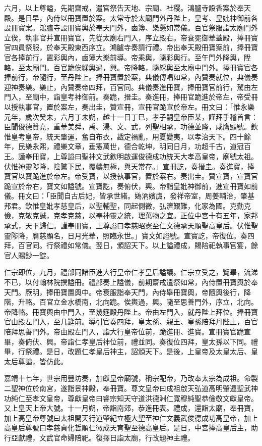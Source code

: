 六月，以上尊謚，先期齋戒，遣官祭告天地、宗廟、社稷。鴻臚寺設香案於奉天殿。是日早，內侍以冊寶置於案。太常寺於太廟門外丹陛上，皇考、皇妣神御前各設冊寶案。鴻臚寺設冊寶輿於奉天門外，鹵簿、樂懸如常儀。百官祭服詣太廟門外立俟，執事官并宣冊寶官，先從太廟右門入，序立殿右。帝袞冕御華蓋殿，捧冊寶官四員祭服，於奉天殿東西序立。鴻臚寺奏請行禮。帝出奉天殿冊寶案前，捧冊寶官各捧前行，置彩輿內，鹵簿大樂前導。帝乘輿，隨彩輿行。至午門外降輿，陞輅，至太廟門。百官跪俟綵輿過，興。帝降輅，隨綵輿至太廟中門外。捧冊寶官各捧前行，帝隨行，至丹陛上。捧冊寶置於案，典儀傳唱如常，內贊奏就位，典儀奏迎神奏樂。樂止，內贊奏帝四拜，百官同。典儀奏進冊寶，捧冊寶官前行，駕由左門入，至廟中，詣皇考神御前。奏跪，搢圭。奏進冊，捧冊官跪進於帝左，帝受冊以授執事官，置於案左，奏出圭，贊宣冊，宣冊官跪宣於帝左。冊文曰：「惟永樂元年，歲次癸未，六月丁未朔，越十一日丁巳，孝子嗣皇帝臣某，謹拜手稽首言：臣聞俊德贊堯，重華美舜，禹、湯、文、武，列聖相承，功德並隆，咸膺顯號。欽惟皇考皇帝，統天肇運，奮自布衣，戡定禍亂，用夏變夷，以孝治天下。四十餘年，民樂永熙，禮樂文章，垂憲萬世，德合乾坤，明同日月，功超千古，道冠百王。謹奉冊寶，上尊謚曰聖神文武欽明啟運俊德成功統天大孝高皇帝，廟號太祖。伏惟神靈陟降，陰騭下民，覆幬無極，與天常存。」宣冊訖，奏搢圭。奏進寶，捧寶官以寶跪進於帝左。帝受寶，以授執事官，置於案右。奏出圭。贊宣寶，宣寶官跪宣於帝右，寶文如謚號。宣寶訖，奏俯伏，興。帝詣皇妣神御前，進宣冊寶如前儀。冊文曰：「臣聞自古后妃，皆承世緒。媯汭嬪虞，發祥帝室，周姜輔治，肇基邦君。欽惟皇妣孝慈皇后，以聖輔聖，同起側微，弘濟艱難，化家為國。克勤克儉，克敬克誠，克孝克慈，以奉神靈之統，理萬物之宜。正位中宮十有五年，家邦承式，天下歸仁。謹奉冊寶，上尊謚曰孝慈昭憲至仁文德承天順聖高皇后。伏惟聖靈陟降，膺慈顯名，日月光華，照臨永世。」寶文如謚號。宣寶訖，帝復位。奏四拜，百官同。行祭禮如常儀。翌日，頒詔天下。以上謚禮成，賜陪祀執事官宴，餘官人賜鈔一錠。

仁宗即位，九月，禮部同諸臣進大行皇帝仁孝皇后謚議。仁宗立受之，覽畢，流涕不已，以付翰林院撰謚冊。禮部奏上謚儀，前期齋戒遣祭如常，內侍置冊寶輿於奉天門。厥明，捧冊寶置輿中。帝衰服詣奉天門，內侍舉冊寶輿，帝隨輿後行，降階，升輅。百官立金水橋南，北向跪。俟輿過，興。隨至思善門外，序立，北向。帝降輅。冊寶輿由中門入，至幾筵殿丹陛上。帝由左門入，就丹陛上拜位。捧冊寶官由殿左門入，至几筵前。導引官奏四拜，皇太孫、親王、皇孫陪拜丹陛上，百官陪拜思善門外。帝由殿左門入，詣大行皇帝位前，跪進冊、進寶。宣冊寶官跪宣畢，奏俯伏、興。帝詣仁孝皇后神位前，禮並同。奏復位四拜，皇太孫以下同。禮畢，行祭禮。是日，改題仁孝皇后神主，詔頒天下。是後，上皇帝及太皇太后、皇太后尊謚，皆仿此。

嘉靖十七年，世宗用豐坊奏，加獻皇帝廟號，稱宗配帝，乃改奉太宗為成祖。命製二聖神位於南宮，遂詣景神殿，奉冊寶。尊文皇帝曰成祖啟天弘道高明肇運聖武神功純仁至孝文皇帝，尊獻皇帝曰睿宗知天守道洪德淵仁寬穆純聖恭儉敬文獻皇帝。又上皇天上帝大號。十一月朔，帝詣南郊，恭進冊表。禮成，還詣太廟，奉冊寶，加上高皇帝尊號曰太祖開天行道肇紀立極大聖至神仁文義武俊德成功高皇帝，加上高皇后尊號曰孝慈貞化哲順仁徽成天育聖至德高皇后。是日，中宮捧高皇后主，助行亞獻禮，文武官命婦陪祀。復擇日詣太廟，行改題神主禮。

